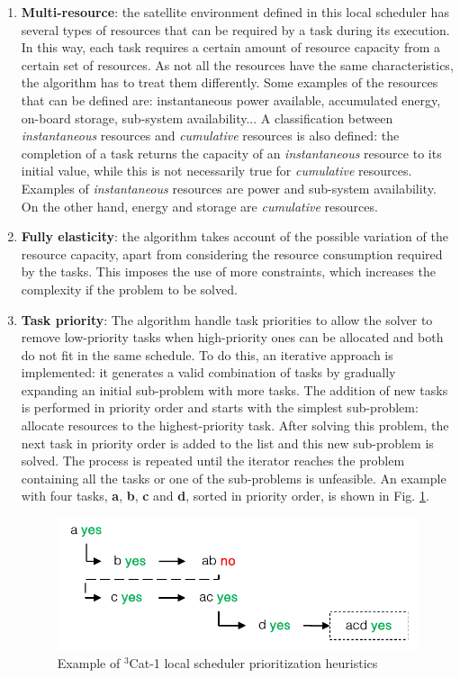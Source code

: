 \begin{enumerate}
\item \textbf{Multi-resource}: the satellite environment defined in this local scheduler has several types of resources that can be required by a task during its execution. In this way, each task requires a certain amount of resource capacity from a certain set of resources. As not all the resources have the same characteristics, the algorithm has to treat them differently. Some examples of the resources that can be defined are: instantaneous power available, accumulated energy, on-board storage, sub-system availability... A classification between \emph{instantaneous} resources and \emph{cumulative} resources is also defined: the completion of a task returns the capacity of an \emph{instantaneous} resource to its initial value, while this is not necessarily true for \emph{cumulative} resources. Examples of \emph{instantaneous} resources are power and sub-system availability. On the other hand, energy and storage are \emph{cumulative} resources.

\item \textbf{Fully elasticity}: the algorithm takes account of the possible variation of the resource capacity, apart from considering the resource consumption required by the tasks. This imposes the use of more constraints, which increases the complexity if the problem to be solved.

\item \textbf{Task priority}: The algorithm handle task priorities to allow the solver to remove low-priority tasks when high-priority ones can be allocated and both do not fit in the same schedule. To do this, an iterative approach is implemented: it generates a valid combination of tasks by gradually expanding an initial sub-problem with more tasks. The addition of new tasks is performed in priority order and starts with the simplest sub-problem: allocate resources to the highest-priority task. After solving this problem, the next task in priority order is added to the list and this new sub-problem is solved. The process is repeated until the iterator reaches the problem containing all the tasks or one of the sub-problems is unfeasible. An example with four tasks, \textbf{a}, \textbf{b}, \textbf{c} and \textbf{d}, sorted in priority order, is shown in Fig. \ref{fig_heuristics}.

\begin{figure}[h!]
\centering
\includegraphics[scale=0.3]{Figures/iterator.png} 
\caption{Example of $^3$Cat-1 local scheduler prioritization heuristics}
\label{fig_heuristics}
\end{figure}


\end{enumerate}
